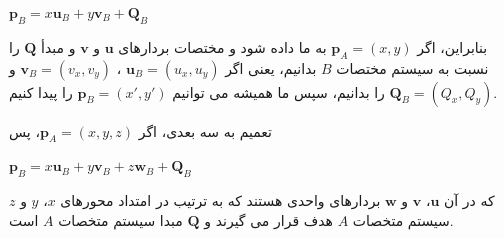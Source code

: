 {\begin{spacing}{1.5}
        \begin{center}
            $\textbf{p}_{B}=x\textbf{u}_{B}+y\textbf{v}_{B}+\textbf{Q}_{B}$
        \end{center}

        بنابراین، اگر $\textbf{p}_{A}=(x, y)$ به ما داده شود و مختصات بردارهای $\textbf{u}$ و $\textbf{v}$ و مبدأ $\textbf{Q}$ را نسبت به سیستم مختصات $B$ بدانیم، یعنی اگر $\textbf{u}_{B}=(u_{x}, u_{y})$ ، $\textbf{v}_{B}=(v_{x}, v_{y})$ و $\textbf{Q}_{B}=(Q_{x}, Q_{y})$ را بدانیم، سپس ما همیشه می توانیم $\textbf{p}_{B}=(x\prime, y\prime)$ را پیدا کنیم.

        تعمیم به سه بعدی، اگر $\textbf{p}_{A}=(x, y, z)$، پس

        \begin{center}
            $\textbf{p}_{B}=x\textbf{u}_{B}+y\textbf{v}_{B}+z\textbf{w}_{B}+\textbf{Q}_{B}$
        \end{center}

        که در آن $\textbf{u}$، $\textbf{v}$ و $\textbf{w}$ بردارهای واحدی هستند که به ترتیب در امتداد محورهای $x$، $y$ و $z$ سیستم متخصات $A$ هدف قرار می گیرند و $\textbf{Q}$ مبدا سیستم متخصات $A$ است.
    \end{spacing}
}

